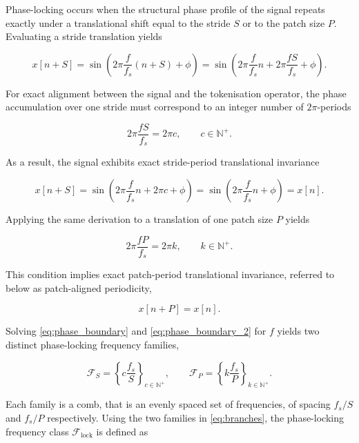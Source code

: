 Phase-locking occurs when the structural phase profile of the signal repeats exactly under a translational shift equal to the stride $S$ or to the patch size $P$. Evaluating a stride translation yields

\begin{equation*}
x[n+S]
=
\sin\!\left(
2\pi\frac{f}{f_s}(n+S)+\phi
\right)
=
\sin\!\left(
2\pi\frac{f}{f_s}n
+
2\pi\frac{fS}{f_s}
+
\phi
\right).
\end{equation*}

For exact alignment between the signal and the tokenisation operator, the phase accumulation over one stride must correspond to an integer number of $2\pi$-periods

\begin{equation}
\label{eq:phase_boundary}
2\pi\frac{fS}{f_s}
=
2\pi c,
\qquad
c\in\mathbb{N}^{+}.
\end{equation}

As a result, the signal exhibits exact stride-period translational invariance

\begin{equation*}
x[n+S]
=
\sin\!\left(
2\pi\frac{f}{f_s}n
+
2\pi c
+
\phi
\right)
=
\sin\!\left(
2\pi\frac{f}{f_s}n
+\phi
\right)
=
x[n].
\end{equation*}

Applying the same derivation to a translation of one patch size $P$ yields

\begin{equation}
\label{eq:phase_boundary_2}
2\pi\frac{fP}{f_s}
=
2\pi k,
\qquad
k\in\mathbb{N}^{+}.
\end{equation}

This condition implies exact patch-period translational invariance, referred to below as patch-aligned periodicity,

\begin{equation*}
x[n+P]
=
x[n].
\end{equation*}

Solving \autoref{eq:phase_boundary} and \autoref{eq:phase_boundary_2} for $f$ yields two distinct phase-locking frequency families,

\begin{equation}
\label{eq:branches}
\mathcal{F}_{S}
=
\left\lbrace{}
c\frac{f_s}{S}
\right\rbrace_{c\in\mathbb{N}^{+}},
\qquad
\mathcal{F}_{P}
=
\left\lbrace{}
k\frac{f_s}{P}
\right\rbrace_{k\in\mathbb{N}^{+}}.
\end{equation}

Each family is a comb, that is an evenly spaced set of frequencies, of spacing $f_s/S$ and $f_s/P$ respectively. Using the two families in \autoref{eq:branches}, the phase-locking frequency class $\mathcal{F}_{\mathrm{lock}}$ is defined as

